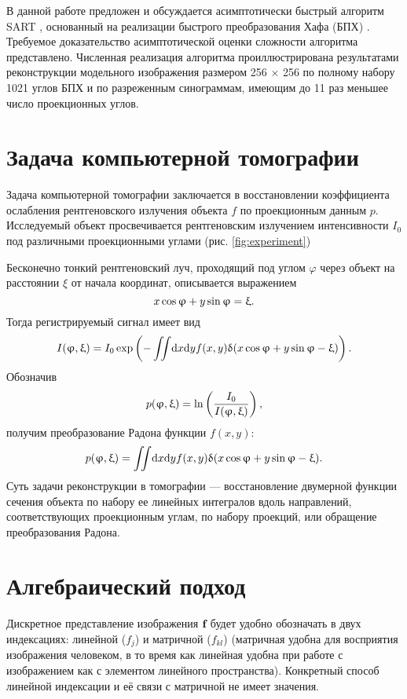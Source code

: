 В данной работе предложен и обсуждается асимптотически быстрый алгоритм SART \cite{sart}, основанный на реализации быстрого преобразования Хафа (БПХ) \cite{hough}. Требуемое доказательство асимптотической оценки сложности алгоритма представлено. Численная реализация алгоритма проиллюстрирована результатами реконструкции модельного изображения размером 256 $\times$ 256 по полному набору 1021 углов БПХ и по разреженным синограммам, имеющим до 11 раз меньшее число проекционных углов.


\section{Задача компьютерной томографии}

Задача компьютерной томографии заключается в восстановлении коэффициента ослабления рентгеновского излучения объекта $f$ по проекционным данным $p$. Исследуемый объект просвечивается рентгеновским излучением интенсивности $I_0$ под различными проекционными углами (рис. \ref{fig:experiment})


Бесконечно тонкий рентгеновский луч, проходящий под углом $\varphi$  через объект на расстоянии $\xi$  от начала координат, описывается выражением
\begin{equation}\notag
  x\cos\varphi + y\sin\varphi = \xi.
\end{equation}
Тогда регистрируемый сигнал имеет вид
\begin{equation}\notag
  I(\varphi, \xi) = I_0 \exp\left( {-\iint \! \mathrm d x \mathrm d y f(x,y)\delta(x\cos\varphi + y\sin\varphi - \xi)}\right).
\end{equation}
Обозначив
\begin{equation}\notag
  p(\varphi, \xi) = \ln \left (\frac{I_0}{I(\varphi, \xi)} \right),
\end{equation}
получим преобразование Радона функции $f(x,y)$:
\begin{equation}\notag
  p(\varphi, \xi)= \iint \! \mathrm d x \mathrm d y f(x,y)\delta(x\cos\varphi + y\sin\varphi - \xi).
\end{equation}
Суть задачи реконструкции в томографии --- восстановление двумерной функции сечения объекта по набору ее линейных интегралов вдоль направлений, соответствующих проекционным углам, по набору проекций, или обращение преобразования Радона.

\section{Алгебраический подход}
Дискретное представление изображения $\textbf f$ будет удобно обозначать в двух индексациях: линейной ($f_j$) и матричной ($f_{kl}$) (матричная удобна для восприятия  изображения человеком, в то время как линейная удобна при работе с изображением как с элементом линейного пространства). Конкретный способ линейной индексации и её связи с матричной не имеет значения.

